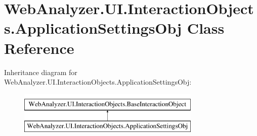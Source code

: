 \hypertarget{class_web_analyzer_1_1_u_i_1_1_interaction_objects_1_1_application_settings_obj}{}\section{Web\+Analyzer.\+U\+I.\+Interaction\+Objects.\+Application\+Settings\+Obj Class Reference}
\label{class_web_analyzer_1_1_u_i_1_1_interaction_objects_1_1_application_settings_obj}
Inheritance diagram for Web\+Analyzer.\+U\+I.\+Interaction\+Objects.\+Application\+Settings\+Obj\+:\begin{figure}[H]
\begin{center}
\leavevmode
\includegraphics[height=2.000000cm]{class_web_analyzer_1_1_u_i_1_1_interaction_objects_1_1_application_settings_obj}
\end{center}
\end{figure}
